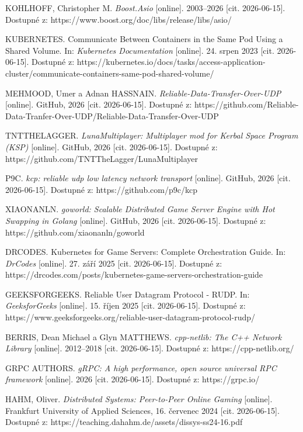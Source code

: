 \documentclass{article}
\begin{document}
\begin{thebibliography}[20]
    KOHLHOFF, Christopher M. \textit{Boost.Asio} [online]. 2003–2026 [cit. 2026-06-15]. Dostupné z: https://www.boost.org/doc/libs/release/libs/asio/

    KUBERNETES. Communicate Between Containers in the Same Pod Using a Shared Volume. In: \textit{Kubernetes Documentation} [online]. 24. srpen 2023 [cit. 2026-06-15]. Dostupné z: https://kubernetes.io/docs/tasks/access-application-cluster/communicate-containers-same-pod-shared-volume/

    MEHMOOD, Umer a Adnan HASSNAIN. \textit{Reliable-Data-Transfer-Over-UDP} [online]. GitHub, 2026 [cit. 2026-06-15]. Dostupné z: https://github.com/Reliable-Data-Tranfer-Over-UDP/Reliable-Data-Transfer-Over-UDP

    TNTTHELAGGER. \textit{LunaMultiplayer: Multiplayer mod for Kerbal Space Program (KSP)} [online]. GitHub, 2026 [cit. 2026-06-15]. Dostupné z: https://github.com/TNTTheLagger/LunaMultiplayer

    P9C. \textit{kcp: reliable udp low latency network transport} [online]. GitHub, 2026 [cit. 2026-06-15]. Dostupné z: https://github.com/p9c/kcp

    XIAONANLN. \textit{goworld: Scalable Distributed Game Server Engine with Hot Swapping in Golang} [online]. GitHub, 2026 [cit. 2026-06-15]. Dostupné z: https://github.com/xiaonanln/goworld

    DRCODES. Kubernetes for Game Servers: Complete Orchestration Guide. In: \textit{DrCodes} [online]. 27. září 2025 [cit. 2026-06-15]. Dostupné z: https://drcodes.com/posts/kubernetes-game-servers-orchestration-guide

    GEEKSFORGEEKS. Reliable User Datagram Protocol - RUDP. In: \textit{GeeksforGeeks} [online]. 15. říjen 2025 [cit. 2026-06-15]. Dostupné z: https://www.geeksforgeeks.org/reliable-user-datagram-protocol-rudp/

    BERRIS, Dean Michael a Glyn MATTHEWS. \textit{cpp-netlib: The C++ Network Library} [online]. 2012–2018 [cit. 2026-06-15]. Dostupné z: https://cpp-netlib.org/

    GRPC AUTHORS. \textit{gRPC: A high performance, open source universal RPC framework} [online]. 2026 [cit. 2026-06-15]. Dostupné z: https://grpc.io/

    HAHM, Oliver. \textit{Distributed Systems: Peer-to-Peer Online Gaming} [online]. Frankfurt University of Applied Sciences, 16. červenec 2024 [cit. 2026-06-15]. Dostupné z: https://teaching.dahahm.de/assets/dissys-ss24-16.pdf


\end{thebibliography}
\end{document}
